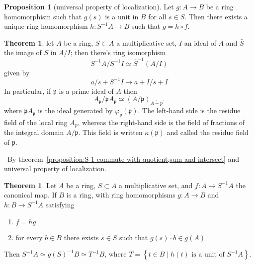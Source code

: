 \documentclass[a4paper,12pt]{article}
\newenvironment{prooff}{{\noindent\it\textcolor{cyan!40!black}{Proof}:}\,}{\par}
\newcommand{\bbrace}[1]{\left\{ #1 \right\} }
\theoremstyle{definition}
\newtheorem{theo}[defn]{Theorem}
\newtheorem{prop}[defn]{Proposition}
\begin{document}
\begin{prop}[universal property of localization]
    Let $g: A \rightarrow B$ be a ring homomorphism such that $g(s)$ is a unit in $B$ for all $s \in S$. Then there exists a unique ring homomorphism $h: S^{-1} A \rightarrow B$ such that $g=h \circ f$.
\end{prop}
\begin{theo}
    let $A$ be a ring, $S \subset A$ a multiplicative set, $I$ an ideal of $A$ and $\bar{S}$ the image of $S$ in $A / I$; then there's ring isomorphism
    $$
        S^{-1}A/ S^{-1}I \simeq  \bar{S}^{-1}(A/I)
    $$
    given by
    \begin{equation*}
        a/s+S^{-1}I \mapsto a+I/s+I
    \end{equation*}
    In particular, if $\mathfrak{p}$ is a prime ideal of $A$ then
    $$
        A_{\mathfrak{p}} / \mathfrak{p} A_{\mathfrak{p}} \simeq(A / \mathfrak{p})_{\overline{A-p}} .
    $$
    where $\mathfrak{p} A_{\mathfrak{p}}$ is the ideal generated by $\varphi_{\mathfrak{p}}(\mathfrak{p})$.
    The left-hand side is the residue field of the local ring $A_p$, whereas the right-hand side is the field of fractions of the integral domain $A / \mathfrak{p}$. This field is written $\kappa(\mathfrak{p})$ and called the residue field of $\mathfrak{p}$.
\end{theo}
\begin{prooff}
    By theorem~\ref{proposition:S-1 commute with quotient,sum and intersect} and universal property of localization.
\end{prooff}
\begin{theo}
    Let $A$ be a ring, $S \subset A$ a multiplicative set, and $f: A \longrightarrow S^{-1}A$ the canonical map. If $B$ is a ring, with ring homomorphisms $g: A \longrightarrow B$ and $h: B \longrightarrow S^{-1}A$ satisfying
    \begin{enumerate}[(1)]
        \item $f=h g$
        \item for every $b \in B$ there exists $s \in S$ such that $g(s) \cdot b \in g(A)$
    \end{enumerate}
    Then $S^{-1}A\simeq g(S)^{-1}B\simeq T^{-1}B$, where $T=\bbrace{t \in B \mid h(t) \text{ is a unit of } S^{-1}A }$.
\end{theo}
\end{document}
